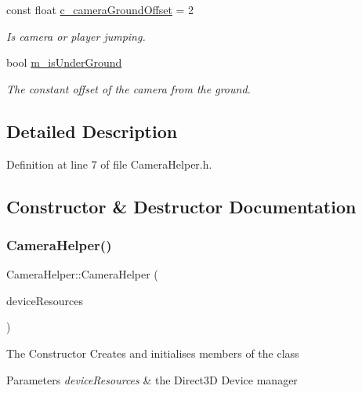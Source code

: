 \begin{DoxyCompactItemize}
const float \mbox{\hyperlink{class_camera_helper_ac0b6f1a7975e28a7604985da3f29278b}{c\+\_\+camera\+Ground\+Offset}} = 2
\begin{DoxyCompactList}\small\item\em Is camera or player jumping. \end{DoxyCompactList}\item 
bool \mbox{\hyperlink{class_camera_helper_a58fe7fb37f0bda549c7a8cc59fb58042}{m\+\_\+is\+Under\+Ground}}
\begin{DoxyCompactList}\small\item\em The constant offset of the camera from the ground. \end{DoxyCompactList}\end{DoxyCompactItemize}


\subsection{Detailed Description}


Definition at line 7 of file Camera\+Helper.\+h.



\subsection{Constructor \& Destructor Documentation}
\mbox{\label{class_camera_helper_a401e32c823d85e9dedeebfd67318e557}} 
\subsubsection{\texorpdfstring{Camera\+Helper()}{CameraHelper()}}
{\footnotesize\ttfamily Camera\+Helper\+::\+Camera\+Helper (\begin{DoxyParamCaption}\item[{std\+::shared\+\_\+ptr$<$ \mbox{\hyperlink{class_d_x_1_1_device_resources}{D\+X\+::\+Device\+Resources}} $>$}]{device\+Resources }\end{DoxyParamCaption})}

The Constructor Creates and initialises members of the class 
\begin{DoxyParams}{Parameters}
{\em device\+Resources} & the Direct3D Device manager \\
\hline
\end{DoxyParams}


